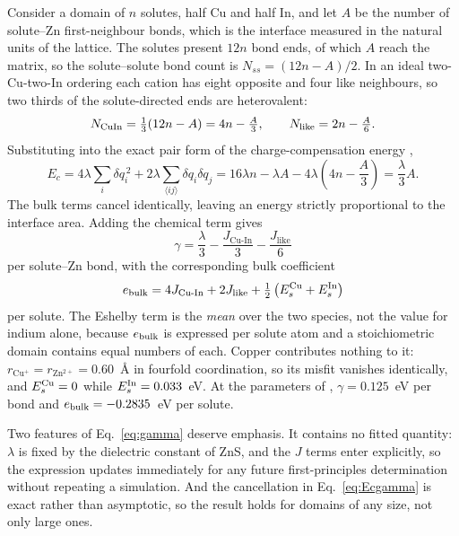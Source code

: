 \documentclass[11pt,a4paper]{article}
\newcommand{\JCuIn}{J_{\mathrm{Cu\text{-}In}}}
\newcommand{\Jlike}{J_{\mathrm{like}}}
\begin{document}
Consider a domain of $n$ solutes, half Cu and half In, and let $A$ be the number
of solute--Zn first-neighbour bonds, which is the interface measured in the
natural units of the lattice. The solutes present $12n$ bond ends, of which $A$
reach the matrix, so the solute--solute bond count is $N_{ss} = (12n - A)/2$. In
an ideal two-Cu-two-In ordering each cation has eight opposite and four like
neighbours, so two thirds of the solute-directed ends are heterovalent:
\begin{equation}
N_{\rm CuIn} = \tfrac{1}{3}(12n - A) = 4n - \tfrac{A}{3},
\qquad
N_{\rm like} = 2n - \tfrac{A}{6}.
\label{eq:bondcounts}
\end{equation}
Substituting into the exact pair form of the charge-compensation energy
\citep{yu2026},
\begin{equation}
E_c = 4\lambda \sum_i \delta q_i^{\,2}
    + 2\lambda \sum_{\langle ij \rangle} \delta q_i \delta q_j
    = 16\lambda n - \lambda A - 4\lambda\left(4n - \frac{A}{3}\right)
    = \frac{\lambda}{3} A .
\label{eq:Ecgamma}
\end{equation}
The bulk terms cancel identically, leaving an energy strictly proportional to
the interface area. Adding the chemical term gives
\begin{equation}
\boxed{\;
\gamma = \frac{\lambda}{3} - \frac{\JCuIn}{3} - \frac{\Jlike}{6}
\;}
\label{eq:gamma}
\end{equation}
per solute--Zn bond, with the corresponding bulk coefficient
\begin{equation}
e_{\rm bulk} = 4\JCuIn + 2\Jlike
             + \tfrac{1}{2}\left(E_s^{\rm Cu} + E_s^{\rm In}\right)
\label{eq:ebulk}
\end{equation}
per solute. The Eshelby term is the \emph{mean} over the two species, not the
value for indium alone, because $e_{\rm bulk}$ is expressed per solute atom and
a stoichiometric domain contains equal numbers of each. Copper contributes
nothing to it: $r_{\mathrm{Cu^+}} = r_{\mathrm{Zn^{2+}}} = 0.60$~\AA{} in
fourfold coordination, so its misfit vanishes identically, and
$E_s^{\rm Cu} = 0$ while $E_s^{\rm In} = 0.033$~eV. At the parameters of
\citet{yu2026}, $\gamma = 0.125$~eV per bond and $e_{\rm bulk} = -0.2835$~eV per
solute.

Two features of Eq.~\eqref{eq:gamma} deserve emphasis. It contains no fitted
quantity: $\lambda$ is fixed by the dielectric constant of ZnS, and the $J$
terms enter explicitly, so the expression updates immediately for any future
first-principles determination without repeating a simulation. And the
cancellation in Eq.~\eqref{eq:Ecgamma} is exact rather than asymptotic, so the
result holds for domains of any size, not only large ones.
\end{document}
